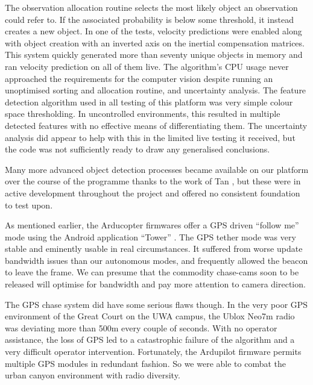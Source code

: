 \documentclass{article}
\newcounter{subsubsubsection}[subsubsection]
\begin{document}
        The observation allocation routine selects the most likely object an observation could refer to. If the associated probability is below some threshold, it instead creates a new object.
        In one of the tests, velocity predictions were enabled along with object creation with an inverted axis on the inertial compensation matrices. This system quickly generated more than seventy unique objects in memory and ran velocity prediction on all of them live. The algorithm's CPU usage never approached the requirements for the computer vision despite running an unoptimised sorting and allocation routine, and uncertainty analysis.
        The feature detection algorithm used in all testing of this platform was very simple colour space thresholding.  In uncontrolled environments, this resulted in multiple detected features with no effective means of differentiating them.  The uncertainty analysis did appear to help with this in the limited live testing it received, but the code was not sufficiently ready to draw any generalised conclusions.

        Many more advanced object detection processes became available on our platform over the course of the programme thanks to the work of Tan \cite{Tan}, but these were in active development throughout the project and offered no consistent foundation to test upon.

        As mentioned earlier, the Arducopter firmwares offer a GPS driven ``follow me'' mode using the Android application ``Tower'' \cite{3dr-tower}.
        The GPS tether mode was very stable and eminently usable in real circumstances.  It suffered from worse update bandwidth issues than our autonomous modes, and frequently allowed the beacon to leave the frame.  We can presume that the commodity chase-cams soon to be released will optimise for bandwidth and pay more attention to camera direction.

        The GPS chase system did have some serious flaws though.  In the very poor GPS environment of the Great Court on the UWA campus, the Ublox Neo7m radio was deviating more than 500m every couple of seconds.  With no operator assistance, the loss of GPS led to a catastrophic failure of the algorithm and a very difficult operator intervention.  Fortunately, the Ardupilot firmware permits multiple GPS modules in redundant fashion.  So we were able to combat the urban canyon environment with radio diversity.
\end{document}
